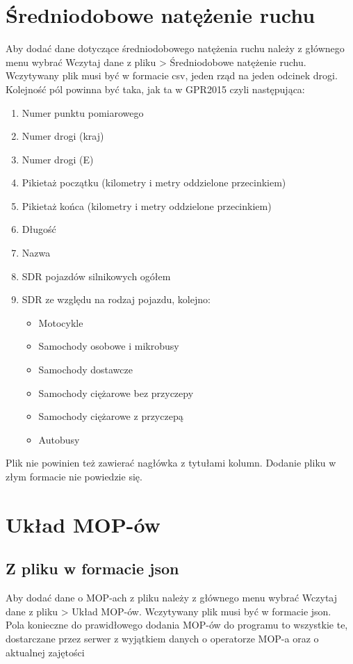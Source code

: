 \documentclass[10pt,paper=a4 BCOR0, DIV15, titlepage=false, oneside]{scrbook} %
\begin{document}
      \section{Średniodobowe natężenie ruchu}
        Aby dodać dane dotyczące średniodobowego natężenia ruchu należy z
        głównego menu wybrać Wczytaj dane z pliku > Średniodobowe natężenie
        ruchu. Wczytywany plik musi być w formacie csv, jeden rząd na jeden
        odcinek drogi. Kolejność pól powinna być taka, jak ta w GPR2015 czyli następująca:
        \begin{enumerate}
          \item Numer punktu pomiarowego
          \item Numer drogi (kraj)
          \item Numer drogi (E)
          \item Pikietaż początku (kilometry i metry oddzielone przecinkiem)
          \item Pikietaż końca (kilometry i metry oddzielone przecinkiem)
          \item Długość
          \item Nazwa
          \item SDR pojazdów silnikowych ogółem 
          \item SDR ze względu na rodzaj pojazdu, kolejno:
          \begin{itemize}
            \item Motocykle
            \item Samochody osobowe i mikrobusy
            \item Samochody dostawcze
            \item Samochody ciężarowe bez przyczepy
            \item Samochody ciężarowe z przyczepą
            \item Autobusy 
          \end{itemize}
        \end{enumerate}
        Plik nie powinien też zawierać nagłówka z tytułami kolumn. Dodanie
        pliku w złym formacie nie powiedzie się.

        \section{Układ MOP-ów}
        \subsection{Z pliku w formacie json}
        Aby dodać dane o MOP-ach z pliku należy z
        głównego menu wybrać Wczytaj dane z pliku > Układ MOP-ów. 
        Wczytywany plik musi być w formacie json. \\
        Pola konieczne do prawidłowego dodania MOP-ów do programu to wszystkie te, dostarczane przez serwer z wyjątkiem danych o operatorze MOP-a oraz o aktualnej zajętości
\end{document}
